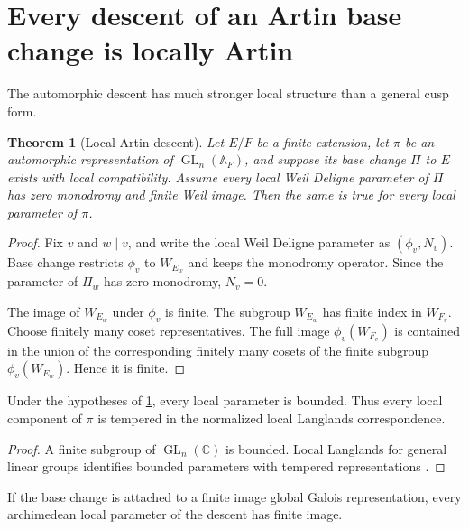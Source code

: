 \documentclass{aomart}
\newtheorem{theorem}{Theorem}[section]
\theoremstyle{definition}
\theoremstyle{remark}
\newcommand{\CC}{\mathbb C}
\newcommand{\Adele}{\mathbb A}
\newcommand{\GL}{\operatorname{GL}}
\begin{document}
\section{Every descent of an Artin base change is locally Artin}\label{sec:local_artin}

The automorphic descent has much stronger local structure than a general cusp form.

\begin{theorem}[Local Artin descent]\label{thm:local_artin_descent}
Let \(E/F\) be a finite extension, let \(\pi\) be an automorphic representation of \(\GL_n(\Adele_F)\), and suppose its base change \(\Pi\) to \(E\) exists with local compatibility. Assume every local Weil Deligne parameter of \(\Pi\) has zero monodromy and finite Weil image. Then the same is true for every local parameter of \(\pi\).
\end{theorem}

\begin{proof}
Fix \(v\) and \(w\mid v\), and write the local Weil Deligne parameter as \((\phi_v,N_v)\). Base change restricts \(\phi_v\) to \(W_{E_w}\) and keeps the monodromy operator. Since the parameter of \(\Pi_w\) has zero monodromy, \(N_v=0\).

The image of \(W_{E_w}\) under \(\phi_v\) is finite. The subgroup \(W_{E_w}\) has finite index in \(W_{F_v}\). Choose finitely many coset representatives. The full image \(\phi_v(W_{F_v})\) is contained in the union of the corresponding finitely many cosets of the finite subgroup \(\phi_v(W_{E_w})\). Hence it is finite.
\end{proof}

\begin{corollary}\label{cor:tempered_local_descent}
Under the hypotheses of \cref{thm:local_artin_descent}, every local parameter is bounded. Thus every local component of \(\pi\) is tempered in the normalized local Langlands correspondence.
\end{corollary}

\begin{proof}
A finite subgroup of \(\GL_n(\CC)\) is bounded. Local Langlands for general linear groups identifies bounded parameters with tempered representations \cite{Henniart2000}.
\end{proof}

\begin{corollary}\label{cor:artin_infinity}
If the base change is attached to a finite image global Galois representation, every archimedean local parameter of the descent has finite image.
\end{corollary}
\end{document}
